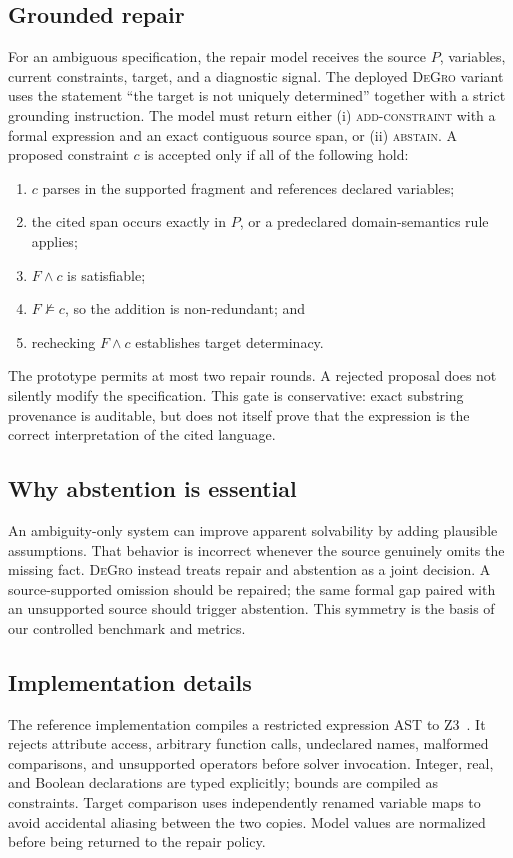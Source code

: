 \documentclass[sigconf,anonymous]{aamas}
\newcommand{\method}{\textsc{DeGro}}
\begin{document}
\subsection{Grounded repair}
For an ambiguous specification, the repair model receives the source $P$, variables, current constraints, target, and a diagnostic signal.  The deployed \method{} variant uses the statement ``the target is not uniquely determined'' together with a strict grounding instruction.  The model must return either (i) \textsc{add-constraint} with a formal expression and an exact contiguous source span, or (ii) \textsc{abstain}.  A proposed constraint $c$ is accepted only if all of the following hold:
\begin{enumerate}
\item $c$ parses in the supported fragment and references declared variables;
\item the cited span occurs exactly in $P$, or a predeclared domain-semantics rule applies;
\item $F\land c$ is satisfiable;
\item $F\not\models c$, so the addition is non-redundant; and
\item rechecking $F\land c$ establishes target determinacy.
\end{enumerate}
The prototype permits at most two repair rounds.  A rejected proposal does not silently modify the specification.  This gate is conservative: exact substring provenance is auditable, but does not itself prove that the expression is the correct interpretation of the cited language.

\subsection{Why abstention is essential}
An ambiguity-only system can improve apparent solvability by adding plausible assumptions.  That behavior is incorrect whenever the source genuinely omits the missing fact.  \method{} instead treats repair and abstention as a joint decision.  A source-supported omission should be repaired; the same formal gap paired with an unsupported source should trigger abstention.  This symmetry is the basis of our controlled benchmark and metrics.

\subsection{Implementation details}
The reference implementation compiles a restricted expression AST to Z3~\cite{demoura2008z3}.  It rejects attribute access, arbitrary function calls, undeclared names, malformed comparisons, and unsupported operators before solver invocation.  Integer, real, and Boolean declarations are typed explicitly; bounds are compiled as constraints.  Target comparison uses independently renamed variable maps to avoid accidental aliasing between the two copies.  Model values are normalized before being returned to the repair policy.
\end{document}
